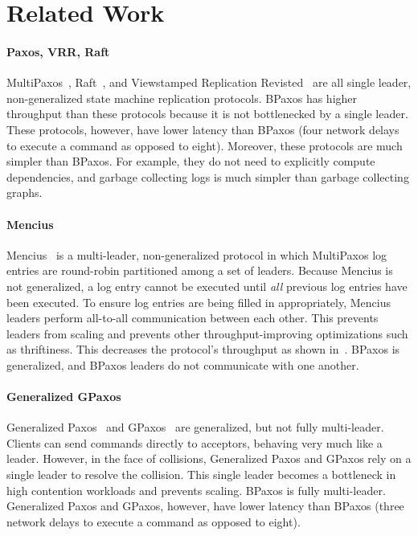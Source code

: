 \section{Related Work}

\paragraph{Paxos, VRR, Raft}
MultiPaxos~\cite{lamport1998part, lamport2001paxos, van2015paxos,
lampson2001abcd, mazieres2007paxos}, Raft~\cite{mazieres2007paxos}, and
Viewstamped Replication Revisted~\cite{liskov2012viewstamped} are all single
leader, non-generalized state machine replication protocols. BPaxos has higher
throughput than these protocols because it is not bottlenecked by a single
leader. These protocols, however, have lower latency than BPaxos (four network
delays to execute a command as opposed to eight). Moreover, these protocols are
much simpler than BPaxos. For example, they do not need to explicitly compute
dependencies, and garbage collecting logs is much simpler than garbage
collecting graphs.

\paragraph{Mencius}
Mencius~\cite{mao2008mencius} is a multi-leader, non-generalized protocol in
which MultiPaxos log entries are round-robin partitioned among a set of
leaders. Because Mencius is not generalized, a log entry cannot be executed
until \emph{all} previous log entries have been executed. To ensure log entries
are being filled in appropriately, Mencius leaders perform all-to-all
communication between each other. This prevents leaders from scaling and
prevents other throughput-improving optimizations such as thriftiness. This
decreases the protocol's throughput as shown in~\cite{moraru2013proof}. BPaxos
is generalized, and BPaxos leaders do not communicate with one another.

\paragraph{Generalized GPaxos}
Generalized Paxos~\cite{lamport2005generalized} and GPaxos~\cite{sutra2011fast}
are generalized, but not fully multi-leader. Clients can send commands directly
to acceptors, behaving very much like a leader. However, in the face of
collisions, Generalized Paxos and GPaxos rely on a single leader to resolve the
collision. This single leader becomes a bottleneck in high contention workloads
and prevents scaling. BPaxos is fully multi-leader. Generalized Paxos and
GPaxos, however, have lower latency than BPaxos (three network delays to
execute a command as opposed to eight).

